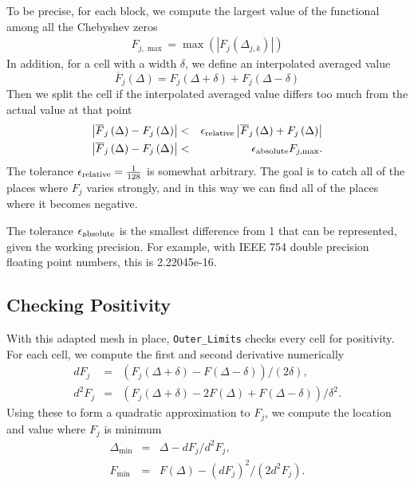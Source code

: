 \documentclass[12pt]{article}
\numberwithin{equation}{section}
\begin{document}
To be precise, for each block, we compute the largest value of the
functional among all the Chebyshev zeros
\begin{eqnarray}
  F_{j,\max} = \max \left( \left| F_{j} \left(\Delta_{j,k} \right) \right| \right)
\end{eqnarray}
In addition, for a cell with a width $\delta$, we define an interpolated averaged value
\begin{equation}
  \overline{F}_j\left(\Delta\right) = F_j\left(\Delta + \delta\right) + F_j\left(\Delta - \delta\right)
\end{equation}
Then we split the cell if the interpolated averaged value differs too
much from the actual value at that point
\begin{eqnarray}
  \left|\overline{F}_j\left(\Delta\right) - F_j\left(\Delta\right)\right| & < & \epsilon_{\rm{relative}} \left|\overline{F}_j\left(\Delta\right) + F_j\left(\Delta\right)\right|\\
  \left|\overline{F}_j\left(\Delta\right) - F_j\left(\Delta\right)\right| & < & \epsilon_{\rm{absolute}} F_{j,\max}.
\end{eqnarray}
The tolerance $\epsilon_{\rm{relative}}=\frac{1}{128}$ is somewhat
arbitrary.  The goal is to catch all of the places where $F_j$ varies
strongly, and in this way we can find all of the places where it
becomes negative.

The tolerance $\epsilon_{\rm{absolute}}$ is the smallest difference from 1
that can be represented, given the working precision.  For example,
with IEEE 754 double precision floating point numbers, this is
2.22045e-16.

\subsection{Checking Positivity}
\label{subsec:checkingpositivity}

With this adapted mesh in place, \texttt{Outer\_Limits} checks every
cell for positivity. For each cell, we compute the first and
second derivative numerically
\begin{eqnarray}
  dF_{j} & = &\left( F_{j}\left( \Delta + \delta \right) - F\left( \Delta - \delta \right) \right)/\left( 2 \delta \right),\\
  d^{2}F_{j} & = & \left( F_{j}\left( \Delta + \delta \right) - 2 F\left( \Delta \right) + F\left( \Delta - \delta \right) \right)/ \delta^2.
\end{eqnarray}
Using these to form a quadratic approximation to $F_{j}$, we compute
the location and value where $F_{j}$ is minimum
\begin{eqnarray}
  \Delta_{\min} & = & \Delta - dF_{j}/d^{2}F_{j},\\
  F_{\min} & = & F\left(\Delta\right) - \left(dF_{j}\right)^{2} /\left( 2 d^{2}F_{j}\right).
\end{eqnarray}
\end{document}
